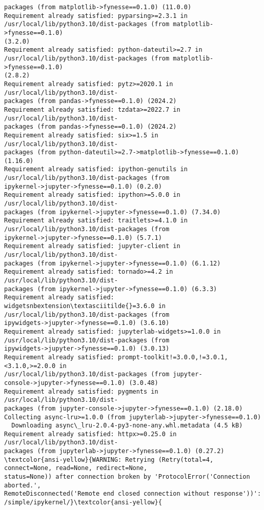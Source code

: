 \documentclass[11pt]{article}
\begin{document}
\begin{Verbatim}[commandchars=\\\{\}]
packages (from matplotlib->fynesse==0.1.0) (11.0.0)
Requirement already satisfied: pyparsing>=2.3.1 in
/usr/local/lib/python3.10/dist-packages (from matplotlib->fynesse==0.1.0)
(3.2.0)
Requirement already satisfied: python-dateutil>=2.7 in
/usr/local/lib/python3.10/dist-packages (from matplotlib->fynesse==0.1.0)
(2.8.2)
Requirement already satisfied: pytz>=2020.1 in /usr/local/lib/python3.10/dist-
packages (from pandas->fynesse==0.1.0) (2024.2)
Requirement already satisfied: tzdata>=2022.7 in /usr/local/lib/python3.10/dist-
packages (from pandas->fynesse==0.1.0) (2024.2)
Requirement already satisfied: six>=1.5 in /usr/local/lib/python3.10/dist-
packages (from python-dateutil>=2.7->matplotlib->fynesse==0.1.0) (1.16.0)
Requirement already satisfied: ipython-genutils in
/usr/local/lib/python3.10/dist-packages (from
ipykernel->jupyter->fynesse==0.1.0) (0.2.0)
Requirement already satisfied: ipython>=5.0.0 in /usr/local/lib/python3.10/dist-
packages (from ipykernel->jupyter->fynesse==0.1.0) (7.34.0)
Requirement already satisfied: traitlets>=4.1.0 in
/usr/local/lib/python3.10/dist-packages (from
ipykernel->jupyter->fynesse==0.1.0) (5.7.1)
Requirement already satisfied: jupyter-client in /usr/local/lib/python3.10/dist-
packages (from ipykernel->jupyter->fynesse==0.1.0) (6.1.12)
Requirement already satisfied: tornado>=4.2 in /usr/local/lib/python3.10/dist-
packages (from ipykernel->jupyter->fynesse==0.1.0) (6.3.3)
Requirement already satisfied: widgetsnbextension\textasciitilde{}=3.6.0 in
/usr/local/lib/python3.10/dist-packages (from
ipywidgets->jupyter->fynesse==0.1.0) (3.6.10)
Requirement already satisfied: jupyterlab-widgets>=1.0.0 in
/usr/local/lib/python3.10/dist-packages (from
ipywidgets->jupyter->fynesse==0.1.0) (3.0.13)
Requirement already satisfied: prompt-toolkit!=3.0.0,!=3.0.1,<3.1.0,>=2.0.0 in
/usr/local/lib/python3.10/dist-packages (from jupyter-
console->jupyter->fynesse==0.1.0) (3.0.48)
Requirement already satisfied: pygments in /usr/local/lib/python3.10/dist-
packages (from jupyter-console->jupyter->fynesse==0.1.0) (2.18.0)
Collecting async-lru>=1.0.0 (from jupyterlab->jupyter->fynesse==0.1.0)
  Downloading async\_lru-2.0.4-py3-none-any.whl.metadata (4.5 kB)
Requirement already satisfied: httpx>=0.25.0 in /usr/local/lib/python3.10/dist-
packages (from jupyterlab->jupyter->fynesse==0.1.0) (0.27.2)
\textcolor{ansi-yellow}{WARNING: Retrying (Retry(total=4, connect=None, read=None, redirect=None,
status=None)) after connection broken by 'ProtocolError('Connection aborted.',
RemoteDisconnected('Remote end closed connection without response'))':
/simple/ipykernel/}\textcolor{ansi-yellow}{

\end{Verbatim}
\end{document}
